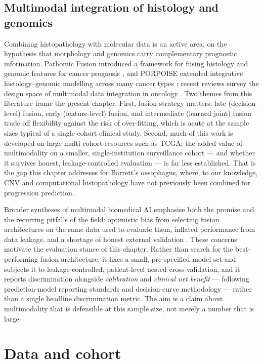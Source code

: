 \subsection{Multimodal integration of histology and genomics}
Combining histopathology with molecular data is an active area, on the
hypothesis that morphology and genomics carry complementary prognostic
information. Pathomic Fusion introduced a framework for fusing histology and
genomic features for cancer prognosis \cite{chen2020pathomic}, and PORPOISE
extended integrative histology--genomic modelling across many cancer types
\cite{chen2022porpoise}; recent reviews survey the design space of multimodal
data integration in oncology \cite{lipkova2022multimodal}. Two themes from this
literature frame the present chapter. First, fusion strategy matters: late
(decision-level) fusion, early (feature-level) fusion, and intermediate
(learned joint) fusion trade off flexibility against the risk of over-fitting,
which is acute at the sample sizes typical of a single-cohort clinical study.
Second, much of this work is developed on large multi-cohort resources such as
TCGA; the added value of multimodality on a smaller, single-institution
surveillance cohort --- and whether it survives honest, leakage-controlled
evaluation --- is far less established. That is the gap this chapter addresses
for Barrett's oesophagus, where, to our knowledge, CNV and computational
histopathology have not previously been combined for progression prediction.

Broader syntheses of multimodal biomedical AI emphasise both the promise and the
recurring pitfalls of the field: optimistic bias from selecting fusion
architectures on the same data used to evaluate them, inflated performance from
data leakage, and a shortage of honest external validation
\cite{acosta2022,steyaert2023}. These concerns motivate the evaluation stance of
this chapter. Rather than search for the best-performing fusion architecture, it
fixes a small, pre-specified model set and subjects it to leakage-controlled,
patient-level nested cross-validation, and it reports discrimination alongside
\emph{calibration} and \emph{clinical net benefit} --- following prediction-model
reporting standards \cite{collins2015tripod} and decision-curve methodology
\cite{vickers2016netbenefit} --- rather than a single headline discrimination
metric. The aim is a claim about multimodality that is defensible at this sample
size, not merely a number that is large.


\section{Data and cohort}
\label{sec:cohort}

